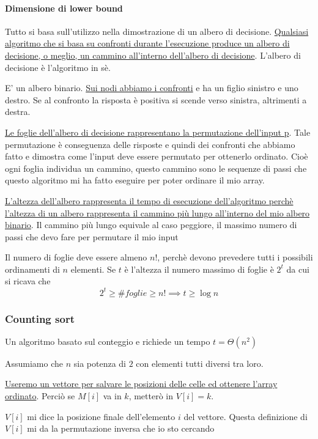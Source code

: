 \paragraph{Dimensione di lower bound}
Tutto si basa sull'utilizzo nella dimostrazione di un albero di decisione. \uline{Qualsiasi algoritmo che si basa su confronti durante l'esecuzione produce un albero di decisione, o meglio, un cammino all'interno dell'albero di decisione}. L'albero di decisione è l'algoritmo in sè.

E' un albero binario. \uline{Sui nodi abbiamo i confronti} e ha un figlio sinistro e uno destro. Se al confronto la risposta è positiva si scende verso sinistra, altrimenti a destra.

\uline{Le foglie dell'albero di decisione rappresentano la permutazione dell'input p}. Tale permutazione è conseguenza delle risposte e quindi dei confronti che abbiamo fatto e dimostra come l'input deve essere permutato per ottenerlo ordinato. Cioè ogni foglia individua un cammino, questo cammino sono le sequenze di passi che questo algoritmo mi ha fatto eseguire per poter ordinare il mio array.

\uline{L'altezza dell'albero rappresenta il tempo di esecuzione dell'algoritmo perchè l'altezza di un albero rappresenta il cammino più lungo all'interno del mio albero binario}. Il cammino più lungo equivale al caso peggiore, il massimo numero di passi che devo fare per permutare il mio input

\begin{osservazione}
    Il numero di foglie deve essere almeno $n!$, perchè devono prevedere tutti i possibili ordinamenti di $n$ elementi. Se $t$ è l'altezza il numero massimo di foglie è $2^t$ da cui si ricava che
    $$2^t \geq \#foglie \geq n! \implies t \geq \log n$$
\end{osservazione}

\subsubsection{Counting sort}
Un algoritmo basato sul conteggio e richiede un tempo $t = \Theta(n^2)$

Assumiamo che $n$ sia potenza di $2$ con elementi tutti diversi tra loro.

\uline{Useremo un vettore per salvare le posizioni delle celle ed ottenere l'array ordinato}. Perciò se $M[i]$ va in $k$, metterò in $V[i] = k$. 

$V[i]$ mi dice la posizione finale dell'elemento $i$ del vettore. Questa definizione di $V[i]$ mi da la permutazione inversa che io sto cercando

